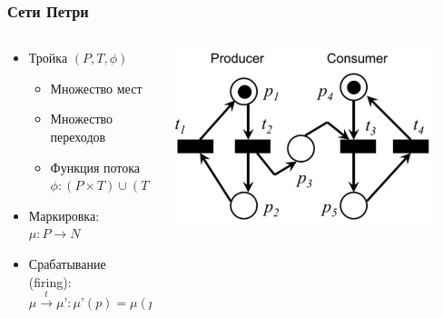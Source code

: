 \documentclass{../../slides-style}
\begin{document}
    \begin{frame}
        \frametitle{Сети Петри}
        \begin{columns}
            \begin{column}{0.6\textwidth}
                \begin{itemize}
                    \item Тройка $(P, T, \phi)$
                    \begin{itemize}
                        \item Множество мест
                        \item Множество переходов
                        \item Функция потока $\phi : (P \times T) \cup (T \times P) \rightarrow N$
                    \end{itemize}
                    \item Маркировка: $\mu : P \rightarrow N$
                    \item Срабатывание (firing):
                    $\mu \xrightarrow{t} \mu’ : \mu’(p) = \mu(p) - \phi(p, t) + \phi(t, p), \forall p \in P$
                \end{itemize}
            \end{column}
            \begin{column}{0.4\textwidth}
                \begin{center}
                    \includegraphics[width=0.9\textwidth]{petri.png}
                \end{center}
            \end{column}
        \end{columns}
    \end{frame}
\end{document}
